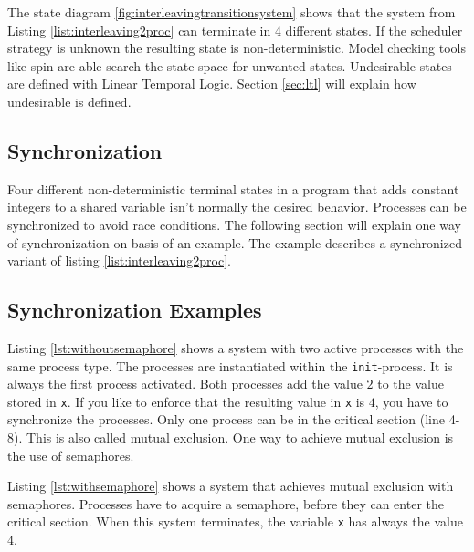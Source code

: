 \documentclass[a4paper, twoside]{article}
\begin{document}
The state diagram \ref{fig:interleavingtransitionsystem} shows that the system from Listing \ref{list:interleaving2proc} can terminate in 4 different states. If the scheduler strategy is unknown the resulting state is non-deterministic. Model checking tools like spin are able search the state space for unwanted states. Undesirable states are defined with Linear Temporal Logic. Section \ref{sec:ltl} will explain how undesirable is defined.

\subsection{Synchronization}
\label{sec:synchronization}

Four different non-deterministic terminal states in a program that adds constant integers to a shared variable isn't normally the desired behavior. Processes can be synchronized to avoid race conditions. The following section will explain one way of synchronization on basis of an example. The example describes a synchronized variant of listing \ref{list:interleaving2proc}.

\subsection{Synchronization Examples}
\label{sec:syncexample}

Listing \ref{lst:withoutsemaphore} shows a system with two active processes with the same process type. The processes are instantiated within the \verb|init|-process. It is always the first process activated. Both processes add the value $2$ to the value stored in \verb|x|. If you like to enforce that the resulting value in \verb|x| is $4$, you have to synchronize the processes. Only one process can be in the critical section (line 4-8). This is also called mutual exclusion. One way to achieve mutual exclusion is the use of semaphores.



Listing \ref{lst:withsemaphore} shows a system that achieves mutual exclusion with semaphores. Processes have to acquire a semaphore, before they can enter the critical section. When this system terminates, the variable \verb|x| has always the value $4$.


\end{document}
